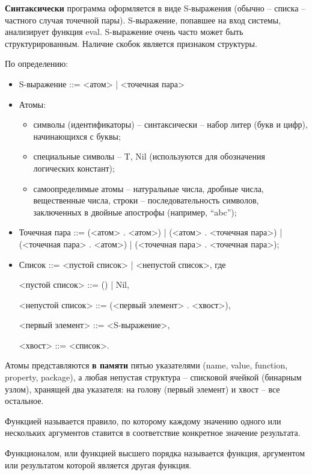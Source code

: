 \documentclass[12pt]{report}
\begin{document}
\textbf{Синтаксически} программа оформляется в виде S-выражения (обычно -- списка -- частного случая точечной пары). S-выражение, попавшее на вход системы, анализирует функция eval. S-выражение очень часто может быть структурированным. Наличие скобок является признаком структуры. 

По определению:
\begin{itemize}
	\item S-выражение ::= <атом> | <точечная пара>

	\item Атомы:
\begin{itemize} 
	\item символы (идентификаторы) – синтаксически – набор литер (букв и цифр), начинающихся с буквы;
	\item специальные символы – {T, Nil} (используются для обозначения логических констант);
	\item самоопределимые атомы – натуральные числа, дробные числа, вещественные числа, строки – последовательность символов, заключенных в двойные апострофы (например, “abc”);
\end{itemize} 


\item Точечная пара ::= (<атом> . <атом>) | (<атом> . <точечная пара>) | (<точечная пара> . <атом>) | (<точечная пара> . <точечная пара>);

\item Список ::= <пустой список> | <непустой список>, где 

<пустой список> ::= () | Nil,

<непустой список> ::= (<первый элемент> . <хвост>),

<первый элемент> ::= <S-выражение>,

<хвост> ::= <список>.

\end{itemize}

Атомы представляются \textbf{в памяти} пятью указателями  (name, value, function, property, package), а любая непустая структура --  списковой ячейкой (бинарным узлом), хранящей два указателя: на голову (первый элемент) и хвост -- все остальное.






Функцией называется правило, по которому каждому значению одного или нескольких  аргументов ставится в соответствие конкретное значение результата. 



Функционалом, или функцией высшего порядка называется функция, аргументом или  результатом которой является другая функция.
\end{document}
